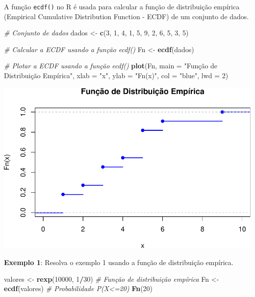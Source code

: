 \documentclass[
]{book}
\newenvironment{Shaded}{\begin{snugshade}}{\end{snugshade}}
\newcommand{\AttributeTok}[1]{\textcolor[rgb]{0.13,0.29,0.53}{#1}}
\newcommand{\CommentTok}[1]{\textcolor[rgb]{0.56,0.35,0.01}{\textit{#1}}}
\newcommand{\DecValTok}[1]{\textcolor[rgb]{0.00,0.00,0.81}{#1}}
\newcommand{\FunctionTok}[1]{\textcolor[rgb]{0.13,0.29,0.53}{\textbf{#1}}}
\newcommand{\NormalTok}[1]{#1}
\newcommand{\OtherTok}[1]{\textcolor[rgb]{0.56,0.35,0.01}{#1}}
\newcommand{\SpecialCharTok}[1]{\textcolor[rgb]{0.81,0.36,0.00}{\textbf{#1}}}
\newcommand{\StringTok}[1]{\textcolor[rgb]{0.31,0.60,0.02}{#1}}
\begin{document}
A função \texttt{ecdf()} no R é usada para calcular a função de distribuição
empírica (Empirical Cumulative Distribution Function - ECDF) de um
conjunto de dados.

\begin{Shaded}
\begin{Highlighting}[]
\CommentTok{\# Conjunto de dados}
\NormalTok{dados }\OtherTok{\textless{}{-}} \FunctionTok{c}\NormalTok{(}\DecValTok{3}\NormalTok{, }\DecValTok{1}\NormalTok{, }\DecValTok{4}\NormalTok{, }\DecValTok{1}\NormalTok{, }\DecValTok{5}\NormalTok{, }\DecValTok{9}\NormalTok{, }\DecValTok{2}\NormalTok{, }\DecValTok{6}\NormalTok{, }\DecValTok{5}\NormalTok{, }\DecValTok{3}\NormalTok{, }\DecValTok{5}\NormalTok{)}

\CommentTok{\# Calcular a ECDF usando a função ecdf()}
\NormalTok{Fn }\OtherTok{\textless{}{-}} \FunctionTok{ecdf}\NormalTok{(dados)}

\CommentTok{\# Plotar a ECDF usando a função ecdf()}
\FunctionTok{plot}\NormalTok{(Fn, }\AttributeTok{main =} \StringTok{"Função de Distribuição Empírica"}\NormalTok{, }\AttributeTok{xlab =} \StringTok{"x"}\NormalTok{, }\AttributeTok{ylab =} \StringTok{"Fn(x)"}\NormalTok{, }\AttributeTok{col =} \StringTok{"blue"}\NormalTok{, }\AttributeTok{lwd =} \DecValTok{2}\NormalTok{)}
\end{Highlighting}
\end{Shaded}

\includegraphics{introR_files/figure-latex/unnamed-chunk-248-1.pdf}

\textbf{Exemplo 1}: Resolva o exemplo 1 usando a função de distribuição
empírica.

\begin{Shaded}
\begin{Highlighting}[]
\NormalTok{valores }\OtherTok{\textless{}{-}} \FunctionTok{rexp}\NormalTok{(}\DecValTok{10000}\NormalTok{, }\DecValTok{1}\SpecialCharTok{/}\DecValTok{30}\NormalTok{)}
\CommentTok{\# Função de distribuição empírica}
\NormalTok{Fn }\OtherTok{\textless{}{-}} \FunctionTok{ecdf}\NormalTok{(valores)}
\CommentTok{\# Probabilidade P(X\textless{}=20)}
\FunctionTok{Fn}\NormalTok{(}\DecValTok{20}\NormalTok{)}
\end{Highlighting}
\end{Shaded}
\end{document}
